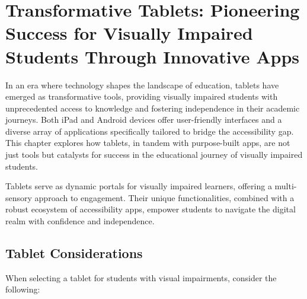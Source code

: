 \chapter{Transformative Tablets: Pioneering Success for Visually Impaired Students Through Innovative Apps}\label{ios-devices}

In an era where technology shapes the landscape of education, tablets have emerged as transformative tools, providing visually impaired students with unprecedented access to knowledge and fostering independence in their academic journeys. Both iPad and Android devices offer user-friendly interfaces and a diverse array of applications specifically tailored to bridge the accessibility gap. This chapter explores how tablets, in tandem with purpose-built apps, are not just tools but catalysts for success in the educational journey of visually impaired students.
 \cite{OrientationMobilityInstruction}

Tablets serve as dynamic portals for visually impaired learners, offering a multi-sensory approach to engagement. Their unique functionalities, combined with a robust ecosystem of accessibility apps, empower students to navigate the digital realm with confidence and independence.

\section{Tablet Considerations}\label{tablet-considerations}

When selecting a tablet for students with visual impairments, consider the following:

